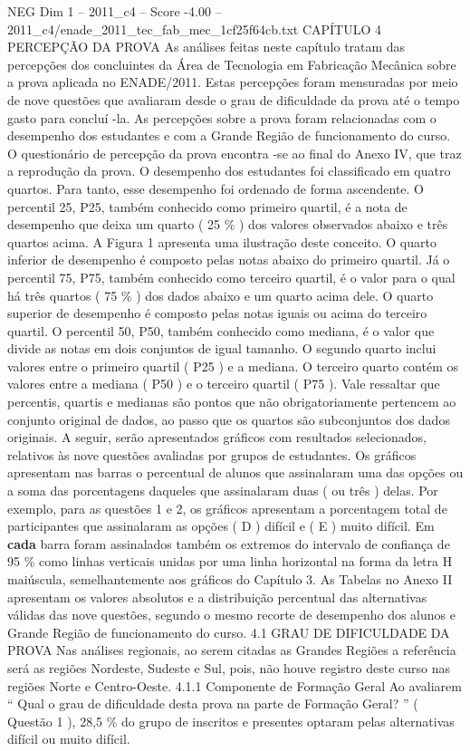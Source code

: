 \begin{textsample}{NEG Dim 1 – 2011\_c4 – Score -4.00 – 2011\_c4/enade\_2011\_tec\_fab\_mec\_1cf25f64cb.txt}  \label{ex:f1_neg_116}
CAPÍTULO 4 PERCEPÇÃO DA PROVA As análises feitas neste capítulo tratam das percepções dos concluintes da Área de Tecnologia em Fabricação Mecânica sobre a prova aplicada no ENADE/2011.
Estas percepções foram mensuradas por meio de nove questões que avaliaram desde o grau de dificuldade da prova até o tempo gasto para concluí -la.
As percepções sobre a prova foram relacionadas com o desempenho dos estudantes e com a Grande Região de funcionamento do curso.
O questionário de percepção da prova encontra -se ao final do Anexo IV, que traz a reprodução da prova.
O desempenho dos estudantes foi classificado em quatro quartos.
Para tanto, esse desempenho foi ordenado de forma ascendente.
O percentil 25, P25, também conhecido como primeiro quartil, é a nota de desempenho que deixa um quarto ( 25 \% ) dos valores observados abaixo e três quartos acima.
A Figura 1 apresenta uma ilustração deste conceito.
O quarto inferior de desempenho é composto pelas notas abaixo do primeiro quartil.
Já o percentil 75, P75, também conhecido como terceiro quartil, é o valor para o qual há três quartos ( 75 \% ) dos dados abaixo e um quarto acima dele.
O quarto superior de desempenho é composto pelas notas iguais ou acima do terceiro quartil.
O percentil 50, P50, também conhecido como mediana, é o valor que divide as notas em dois conjuntos de igual tamanho.
O segundo quarto inclui valores entre o primeiro quartil ( P25 ) e a mediana.
O terceiro quarto contém os valores entre a mediana ( P50 ) e o terceiro quartil ( P75 ).
Vale ressaltar que percentis, quartis e medianas são pontos que não obrigatoriamente pertencem ao conjunto original de dados, ao passo que os quartos são subconjuntos dos dados originais.
A seguir, serão apresentados gráficos com resultados selecionados, relativos às nove questões avaliadas por grupos de estudantes.
Os gráficos apresentam nas barras o percentual de alunos que assinalaram uma das opções ou a soma das porcentagens daqueles que assinalaram duas ( ou três ) delas.
Por exemplo, para as questões 1 e 2, os gráficos apresentam a porcentagem total de participantes que assinalaram as opções ( D ) difícil e ( E ) muito difícil.
Em \textbf{cada} barra foram assinalados também os extremos do intervalo de confiança de 95 \% como linhas verticais unidas por uma linha horizontal na forma da letra H maiúscula, semelhantemente aos gráficos do Capítulo 3.
As Tabelas no Anexo II apresentam os valores absolutos e a distribuição percentual das alternativas válidas das nove questões, segundo o mesmo recorte de desempenho dos alunos e Grande Região de funcionamento do curso. 4.1 GRAU DE DIFICULDADE DA PROVA Nas análises regionais, ao serem citadas as Grandes Regiões a referência será as regiões Nordeste, Sudeste e Sul, pois, não houve registro deste curso nas regiões Norte e Centro-Oeste. 4.1.1 Componente de Formação Geral Ao avaliarem “ Qual o grau de dificuldade desta prova na parte de Formação Geral? ” ( Questão 1 ), 28,5 \% do grupo de inscritos e presentes optaram pelas alternativas difícil ou muito difícil.

\end{textsample}
